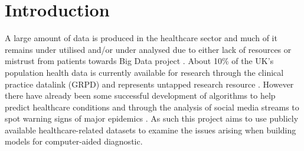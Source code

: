 \chapter{Introduction}
 \setcounter{page}{1}

A large amount of data is produced in the healthcare sector \citep{EMC:2014ve} and much of it remains under utilised and/or under analysed due to either lack of resources \citep{Raghupathi:2014ek} or mistrust from patients towards Big Data project \citep{Goldacre:tf,bcs:2017tl}. About 10\% of the UK's population health data is currently available for research through the clinical practice datalink (GRPD) and represents untapped research resource \citep{Kousoulis:2015ti}. However there have already been some successful development of algorithms to help predict healthcare conditions \citep{Bellon:2013um} and through the analysis of social media streams to spot warning signs of major epidemics \citep{Kostkova:2016ur}.\newline
As such this project aims to use publicly available healthcare-related datasets to examine the issues arising when building models for computer-aided diagnostic.

